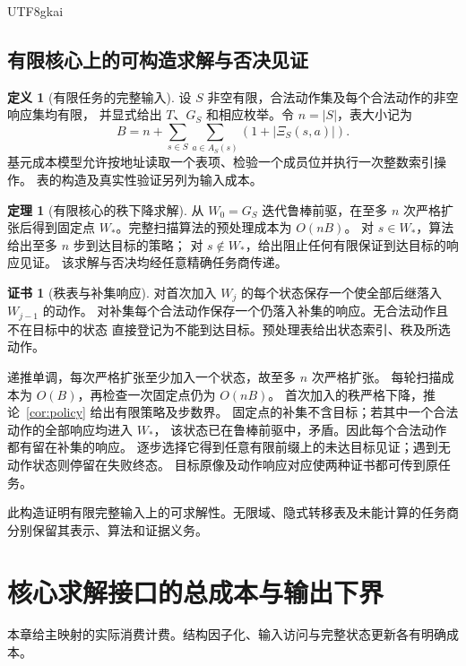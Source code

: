 \documentclass[12pt]{report}
\makeatletter
\theoremstyle{definition}
\newtheorem{definition}{定义}[chapter]
\newtheorem{theorem}{定理}[chapter]
\newtheorem{Certificate}{证书}[chapter]
\renewenvironment{proof}[1][\proofname]{\par
  \pushQED{\qed}\normalfont
  \topsep6\p@\@plus6\p@\relax
  \trivlist
  \item[\hskip\labelsep\normalfont #1\@addpunct{.}]\ignorespaces
}{
  \popQED\endtrivlist\@endpefalse
}
\makeatother
\begin{document}
\begin{CJK*}{UTF8}{gkai}
\section{有限核心上的可构造求解与否决见证}
\begin{definition}[有限任务的完整输入]
\label{def:finite-core-input}
设 \(S\) 非空有限，合法动作集及每个合法动作的非空响应集均有限，
并显式给出 \(T\)、\(G_S\) 和相应枚举。令 \(n=|S|\)，表大小记为
\[
B=n+\sum_{s\in S}\sum_{a\in A_S(s)}(1+|\Xi_S(s,a)|).
\]
基元成本模型允许按地址读取一个表项、检验一个成员位并执行一次整数索引操作。
表的构造及真实性验证另列为输入成本。
\end{definition}
\begin{theorem}[有限核心的秩下降求解]
\label{thm:core-solver}
从 \(W_0=G_S\) 迭代鲁棒前驱，在至多 \(n\) 次严格扩张后得到固定点
\(W_*\)。完整扫描算法的预处理成本为 \(O(nB)\)。
对 \(s\in W_*\)，算法给出至多 \(n\) 步到达目标的策略；
对 \(s\notin W_*\)，给出阻止任何有限保证到达目标的响应见证。
该求解与否决均经任意精确任务商传递。
\end{theorem}
\begin{Certificate}[秩表与补集响应]
对首次加入 \(W_j\) 的每个状态保存一个使全部后继落入 \(W_{j-1}\) 的动作。
对补集每个合法动作保存一个仍落入补集的响应。无合法动作且不在目标中的状态
直接登记为不能到达目标。预处理表给出状态索引、秩及所选动作。
\end{Certificate}
\begin{proof}
递推单调，每次严格扩张至少加入一个状态，故至多 \(n\) 次严格扩张。
每轮扫描成本为 \(O(B)\)，再检查一次固定点仍为 \(O(nB)\)。
首次加入的秩严格下降，推论~\ref{cor:policy} 给出有限策略及步数界。
固定点的补集不含目标；若其中一个合法动作的全部响应均进入 \(W_*\)，
该状态已在鲁棒前驱中，矛盾。因此每个合法动作都有留在补集的响应。
逐步选择它得到任意有限前缀上的未达目标见证；遇到无动作状态则停留在失败终态。
目标原像及动作响应对应使两种证书都可传到原任务。
\end{proof}
此构造证明有限完整输入上的可求解性。无限域、隐式转移表及未能计算的任务商
分别保留其表示、算法和证据义务。

\chapter{核心求解接口的总成本与输出下界}
\label{sec:complexity}
本章给主映射的实际消费计费。结构因子化、输入访问与完整状态更新各有明确成本。

\end{CJK*}
\end{document}
